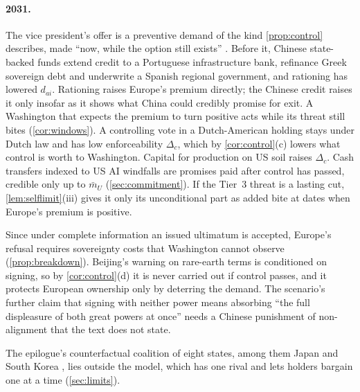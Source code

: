\paragraph{2031.} The vice president's offer is a preventive demand of the kind \cref{prop:control} describes, made ``now, while the option still exists'' \citep{juijn2026europe}. Before it, Chinese state-backed funds extend credit to a Portuguese infrastructure bank, refinance Greek sovereign debt and underwrite a Spanish regional government, and rationing has lowered $d_{ai}$. Rationing raises Europe's premium directly; the Chinese credit raises it only insofar as it shows what China could credibly promise for exit. A Washington that expects the premium to turn positive acts while its threat still bites (\cref{cor:windows}). A controlling vote in a Dutch-American holding stays under Dutch law and has low enforceability $\Delta_c$, which by \cref{cor:control}(c) lowers what control is worth to Washington. Capital for production on US soil raises $\Delta_c$. Cash transfers indexed to US AI windfalls are promises paid after control has passed, credible only up to $\bar m_U$ (\cref{sec:commitment}). If the Tier~3 threat is a lasting cut, \cref{lem:selflimit}(iii) gives it only its unconditional part as added bite at dates when Europe's premium is positive.

Since under complete information an issued ultimatum is accepted, Europe's refusal requires sovereignty costs that Washington cannot observe (\cref{prop:breakdown}). Beijing's warning on rare-earth terms is conditioned on signing, so by \cref{cor:control}(d) it is never carried out if control passes, and it protects European ownership only by deterring the demand. The scenario's further claim that signing with neither power means absorbing ``the full displeasure of both great powers at once'' needs a Chinese punishment of non-alignment that the text does not state.

The epilogue's counterfactual coalition of eight states, among them Japan and South Korea \citep{juijn2026europe}, lies outside the model, which has one rival and lets holders bargain one at a time (\cref{sec:limits}).
